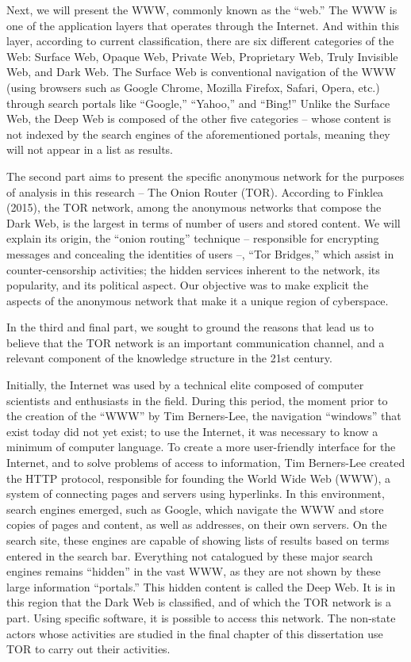 Next, we will present the WWW, commonly known as the ``web.'' The WWW is one of the application layers that operates through the Internet. And within this layer, according to current classification, there are six different categories of the Web: Surface Web, Opaque Web, Private Web, Proprietary Web, Truly Invisible Web, and Dark Web. The Surface Web is conventional navigation of the WWW (using browsers such as Google Chrome, Mozilla Firefox, Safari, Opera, etc.) through search portals like ``Google,'' ``Yahoo,'' and ``Bing!'' Unlike the Surface Web, the Deep Web is composed of the other five categories -- whose content is not indexed by the search engines of the aforementioned portals, meaning they will not appear in a list as results.

The second part aims to present the specific anonymous network for the purposes of analysis in this research -- The Onion Router (TOR). According to Finklea (2015), the TOR network, among the anonymous networks that compose the Dark Web, is the largest in terms of number of users and stored content. We will explain its origin, the ``onion routing'' technique -- responsible for encrypting messages and concealing the identities of users --, ``Tor Bridges,'' which assist in counter-censorship activities; the hidden services inherent to the network, its popularity, and its political aspect. Our objective was to make explicit the aspects of the anonymous network that make it a unique region of cyberspace.

In the third and final part, we sought to ground the reasons that lead us to believe that the TOR network is an important communication channel, and a relevant component of the knowledge structure in the 21st century.

Initially, the Internet was used by a technical elite composed of computer scientists and enthusiasts in the field. During this period, the moment prior to the creation of the ``WWW'' by Tim Berners-Lee, the navigation ``windows'' that exist today did not yet exist; to use the Internet, it was necessary to know a minimum of computer language. To create a more user-friendly interface for the Internet, and to solve problems of access to information, Tim Berners-Lee created the HTTP protocol, responsible for founding the World Wide Web (WWW), a system of connecting pages and servers using hyperlinks. In this environment, search engines emerged, such as Google, which navigate the WWW and store copies of pages and content, as well as addresses, on their own servers. On the search site, these engines are capable of showing lists of results based on terms entered in the search bar. Everything not catalogued by these major search engines remains ``hidden'' in the vast WWW, as they are not shown by these large information ``portals.'' This hidden content is called the Deep Web. It is in this region that the Dark Web is classified, and of which the TOR network is a part. Using specific software, it is possible to access this network. The non-state actors whose activities are studied in the final chapter of this dissertation use TOR to carry out their activities.

